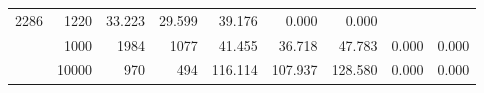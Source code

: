 \begin{table}
\begin{tabular}{rrrrrrrrr}
							     2286  & 1220  
	                           & 33.223 & 29.599 & 39.176
	                           & 0.000 & 0.000  \\
	                
	            
					 &  
					 
					\multirow{ 1 }{*}{ 1000 } &
					
						
							    
							     1984  & 1077  
	                           & 41.455 & 36.718 & 47.783
	                           & 0.000 & 0.000  \\
	                
	            
					 &  
					 
					\multirow{ 1 }{*}{ 10000 } &
					
						
							    
							     970  & 494  
	                           & 116.114 & 107.937 & 128.580
	                           & 0.000 & 0.000  \\
	                
	            
	        

\hline

\end{tabular}
\end{table}
\clearpage


	    
	
	    

